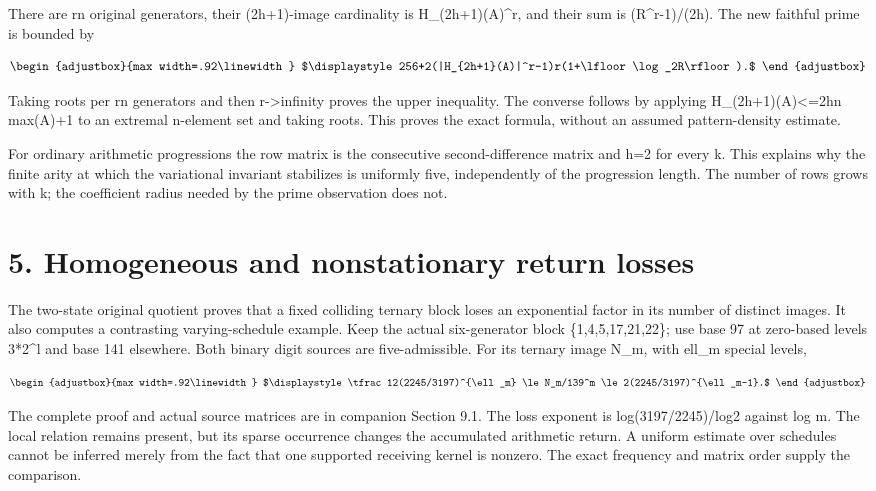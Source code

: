 There are rn original generators, their (2h+1)-image cardinality is \textbar H\_(2h+1)(A)\textbar\^{}r, and their sum is (R\^{}r-1)/(2h). The new faithful prime is bounded by

\[
\begin{adjustbox}{max width=.92\linewidth}
$\displaystyle 256+2(|H_{2h+1}(A)|^r-1)r(1+\lfloor\log_2R\rfloor).$
\end{adjustbox}
\]

Taking roots per rn generators and then r-\textgreater infinity proves the upper inequality. The converse follows by applying \textbar H\_(2h+1)(A)\textbar\textless=2hn max(A)+1 to an extremal n-element set and taking roots. This proves the exact formula, without an assumed pattern-density estimate.

For ordinary arithmetic progressions the row matrix is the consecutive second-difference matrix and h=2 for every k. This explains why the finite arity at which the variational invariant stabilizes is uniformly five, independently of the progression length. The number of rows grows with k; the coefficient radius needed by the prime observation does not.

\section{5. Homogeneous and nonstationary return losses}\label{n23-homogeneous-and-nonstationary-return-losses}

The two-state original quotient proves that a fixed colliding ternary block loses an exponential factor in its number of distinct images. It also computes a contrasting varying-schedule example. Keep the actual six-generator block \{1,4,5,17,21,22\}; use base 97 at zero-based levels 3*2\^{}l and base 141 elsewhere. Both binary digit sources are five-admissible. For its ternary image N\_m, with ell\_m special levels,

\[
\begin{adjustbox}{max width=.92\linewidth}
$\displaystyle \tfrac12(2245/3197)^{\ell_m}
\le N_m/139^m
\le2(2245/3197)^{\ell_m-1}.$
\end{adjustbox}
\]

The complete proof and actual source matrices are in companion Section 9.1. The loss exponent is log(3197/2245)/log2 against log m. The local relation remains present, but its sparse occurrence changes the accumulated arithmetic return. A uniform estimate over schedules cannot be inferred merely from the fact that one supported receiving kernel is nonzero. The exact frequency and matrix order supply the comparison.

